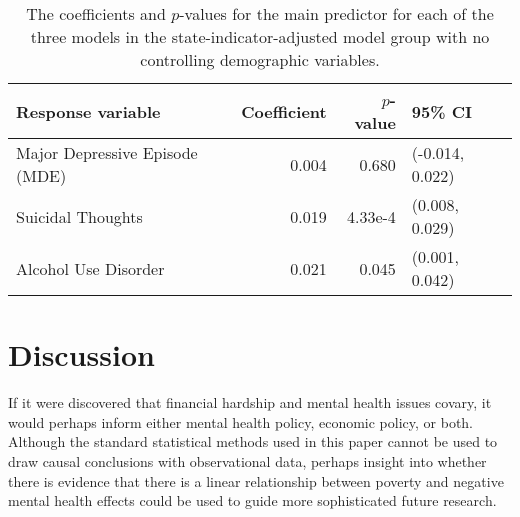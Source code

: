\documentclass{article}
\begin{document}
\begin{table}[t]
\begin{center}
\begin{tabular}{l r r l}
    \toprule
    Response variable & Coefficient & $p$-value & 95\% CI\\
    \midrule
    Major Depressive Episode (MDE) & 0.004 & 0.680 & (-0.014, 0.022)\\
    Suicidal Thoughts & 0.019 & 4.33e-4 & (0.008, 0.029)\\
    Alcohol Use Disorder & 0.021 & 0.045 & (0.001, 0.042)\\
    \bottomrule
\end{tabular}
\caption{\label{tab:state-ind-only-model-results} The coefficients and $p$-values
    for the main predictor for each of the three models
    in the state-indicator-adjusted model group with no controlling demographic variables.
}
\end{center}
\end{table}


\section{Discussion}


If it were discovered that financial hardship and mental
health issues covary, it would perhaps inform
either mental health policy, economic policy, or both.
Although the standard statistical methods used in this paper
cannot be used to draw causal conclusions with observational data,
perhaps insight into whether there is evidence that there
is a linear relationship between poverty and negative mental health effects
could be used to guide more sophisticated future research.
\end{document}
